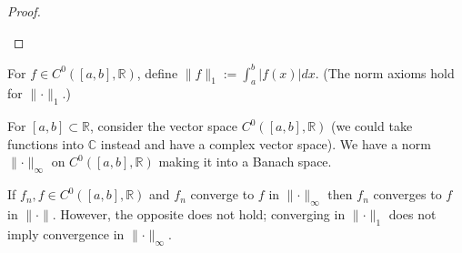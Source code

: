 \begin{proof}
\begin{itemize}
\end{itemize}

\end{proof}

\begin{definition} 

For \(f \in C^0([a,b], \mathbb{R})\), define \(\lVert f \rVert_1 := \int_a^b |f(x)| dx\). (The norm axioms hold for \(\lVert \cdot \rVert_1\).)

\end{definition}

For \([a,b] \subset \mathbb{R}\), consider the vector space \(C^0([a,b], \mathbb{R})\) (we could take functions into \(\mathbb{C}\) instead and have a complex vector space). We have a norm \(\lVert \cdot \rVert_\infty\) on \(C^0([a,b],\mathbb{R})\) making it into a Banach space. 

\begin{proposition}



If \(f_n, f \in C^0([a,b], \mathbb{R})\) and \(f_n\) converge to \(f\) in \(\lVert \cdot \rVert_\infty\) then \(f_n\) converges to \(f\) in \(\lVert \cdot \rVert\). However, the opposite does not hold; converging in \(\lVert \cdot \rVert_1\) does not imply convergence in \(\lVert \cdot \rVert_\infty\).

\end{proposition}


